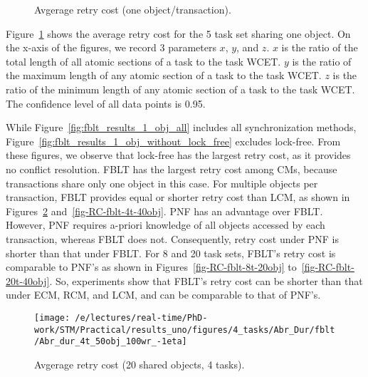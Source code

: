 \documentclass[prodmode,acmtecs]{acmsmall}
\begin{document}
\begin{compactenum}
\begin{figure}
\centering
{}
\caption{Avgerage retry cost (one object/transaction).}

\label{fig:fblt_results_uniobject}
\end{figure}

Figure~\ref{fig:fblt_results_uniobject} shows the average retry cost for the 5 task set sharing one object. On the x-axis of the figures, we record 3 parameters $x$, $y$, and $z$. $x$ is the ratio of the total length of all atomic sections of a task to the task WCET. $y$ is the ratio of the maximum length of any atomic section of a task to the task WCET. $z$ is the ratio of the minimum length of any atomic section of a task to the task WCET. The confidence level of all data points is 0.95.
 
While Figure~\ref{fig:fblt_results_1_obj_all} includes all synchronization methods, Figure~\ref{fig:fblt_results_1_obj_without_lock_free} excludes lock-free. From these figures, we observe that lock-free has the largest retry cost, as it provides no conflict resolution. FBLT has the largest retry cost among CMs,  because transactions share only one object in this case. For multiple objects per transaction, FBLT provides equal or shorter retry cost than LCM, as shown in Figures~\ref{fig-RC-fblt-4t-20obj} and~\ref{fig-RC-fblt-4t-40obj}. PNF has an advantage over FBLT. However, PNF requires a-priori knowledge of all objects accessed by each transaction, whereas FBLT does not. Consequently, retry cost under PNF is shorter than that under FBLT. For 8 and 20 task sets, FBLT's retry cost is comparable to PNF's as shown in Figures~\ref{fig-RC-fblt-8t-20obj} to~\ref{fig-RC-fblt-20t-40obj}. So, experiments show that FBLT's retry cost can be shorter than that under ECM, RCM, and LCM, and can be comparable to that of PNF's.


\begin{figure}
\centering
\texttt{[image: /e/lectures/real-time/PhD-work/STM/Practical/results\_uno/figures/4\_tasks/Abr\_Dur/fblt/Abr\_dur\_4t\_50obj\_100wr\_-1eta]}
\caption{Avgerage retry cost (20 shared objects, 4 tasks).}
\label{fig-RC-fblt-4t-20obj}
\end{figure}


\end{compactenum}
\end{document}

